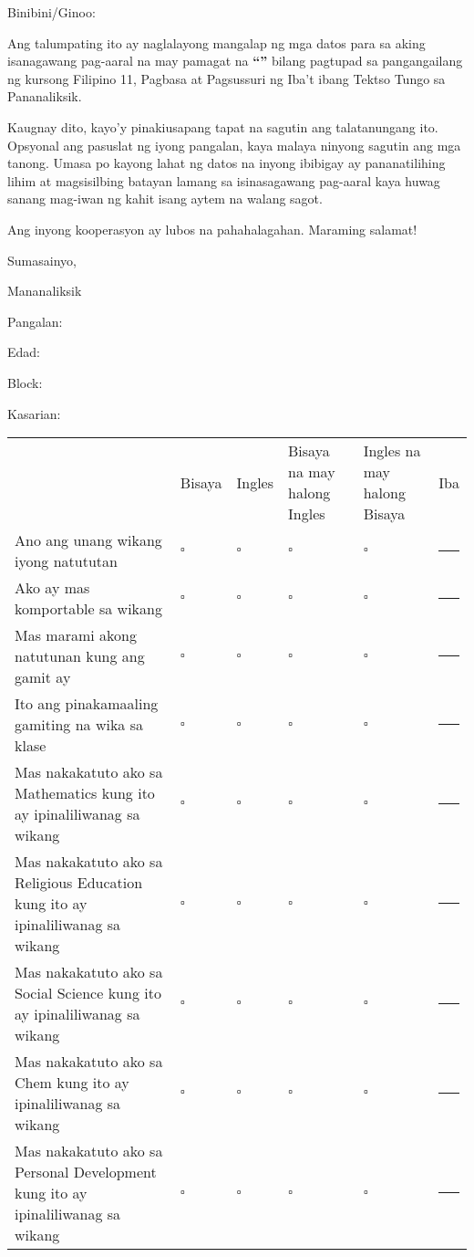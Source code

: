 \documentclass[
  parskip=half,
  backaddress=false,
  address=false,
  foldmarks=true,
  foldmarks=blmtP,
  version=last,
  paper=legal,
  enlargefirstpage=true,
  fromalign=left,
  addrfield=topaligned,
  ]{scrlttr2}
\begin{document}

{

}
Binibini/Ginoo:

Ang talumpating ito ay naglalayong mangalap ng mga datos para sa aking
isanagawang pag-aaral na may pamagat na {\bfseries``\researchtitle''} bilang pagtupad sa
pangangailang ng kursong Filipino 11, Pagbasa at Pagsussuri ng Iba't ibang
Tektso Tungo sa Pananaliksik.

Kaugnay dito, kayo'y pinakiusapang tapat na sagutin ang talatanungang ito.
Opsyonal ang pasuslat ng iyong pangalan, kaya malaya ninyong sagutin ang mga
tanong. Umasa po kayong lahat ng datos na inyong ibibigay ay pananatilihing
lihim at magsisilbing batayan lamang sa isinasagawang pag-aaral kaya huwag
sanang mag-iwan ng kahit isang aytem na walang sagot.

Ang inyong kooperasyon ay lubos na pahahalagahan. Maraming salamat!

Sumasainyo,

Mananaliksik

\vfill

Pangalan: \hrulefill

\begin{multicols}{3}
  Edad: \hrulefill\par
  Block: \hrulefill\par
  Kasarian: \hrulefill
\end{multicols}

\tabulinesep=0.2cm
\newcommand{\question}[1]{#1 & \(\square\) & \(\square\) & \(\square\) & \(\square\)
  & \hrule\\}
\begin{tabu} to 1\textwidth { X[2,l,m] X[1,c,m] X[1,c,m] X[1,c,m] X[1,c,m] X[1,c] }
  & Bisaya & Ingles & Bisaya na may halong Ingles & Ingles na may halong Bisaya & Iba \\
  \question {Ano ang unang wikang iyong natututan}
  \question {Ako ay mas komportable sa wikang}
  \question {Mas marami akong natutunan kung ang gamit ay}
  \question {Ito ang pinakamaaling gamiting na wika sa klase}
  \question {Mas nakakatuto ako sa Mathematics kung ito ay ipinaliliwanag sa wikang}
  \question {Mas nakakatuto ako sa Religious Education kung ito ay ipinaliliwanag sa wikang}
  \question {Mas nakakatuto ako sa Social Science kung ito ay ipinaliliwanag sa wikang}
  \question {Mas nakakatuto ako sa Chem kung ito ay ipinaliliwanag sa wikang}
  \question {Mas nakakatuto ako sa Personal Development kung ito ay ipinaliliwanag sa wikang}%
\end{tabu}
\end{document}
